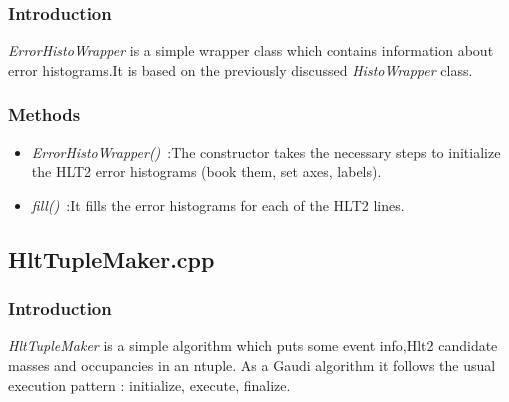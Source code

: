 \subsubsection{\textbf{Introduction}}
\textit{ErrorHistoWrapper} is a simple wrapper class which contains information about error histograms.It is based on the previously discussed \textit{HistoWrapper} class.\par


\subsubsection{\textbf{Methods}}
\begin{itemize}
\item \textit{ErrorHistoWrapper()}~:The constructor takes the necessary steps to initialize the HLT2 error histograms (book them, set axes, labels).\par
\item \textit{fill()}~:It fills the error histograms for each of the HLT2 lines.\par

\end{itemize}

\subsection{\textbf{HltTupleMaker.cpp}}
\subsubsection{\textbf{Introduction}}
\textit{HltTupleMaker} is a simple algorithm which puts some event info,Hlt2 candidate masses and occupancies in an ntuple. As a Gaudi algorithm it follows the usual execution pattern : initialize, execute, finalize.\par

